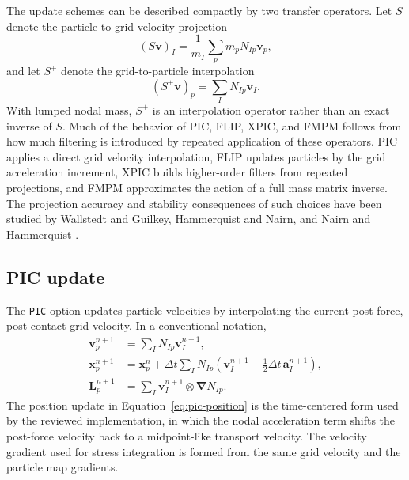 The update schemes can be described compactly by two transfer operators.  Let $S$ denote the particle-to-grid velocity projection
\begin{equation}
  (S\boldsymbol{v})_I = \frac{1}{m_I}\sum_p m_p N_{Ip}\boldsymbol{v}_p,
  \label{eq:operator-S}
\end{equation}
and let $S^+$ denote the grid-to-particle interpolation
\begin{equation}
  (S^+\boldsymbol{v})_p = \sum_I N_{Ip}\boldsymbol{v}_I.
  \label{eq:operator-S-plus}
\end{equation}
With lumped nodal mass, $S^+$ is an interpolation operator rather than an exact inverse of $S$.  Much of the behavior of PIC, FLIP, XPIC, and FMPM follows from how much filtering is introduced by repeated application of these operators.  PIC applies a direct grid velocity interpolation, FLIP updates particles by the grid acceleration increment, XPIC builds higher-order filters from repeated projections, and FMPM approximates the action of a full mass matrix inverse.  The projection accuracy and stability consequences of such choices have been studied by Wallstedt and Guilkey, Hammerquist and Nairn, and Nairn and Hammerquist \cite{wallstedt2007projection,wallstedt2008explicit,hammerquist2017xpic,nairn2021fmpm}.

\subsection{PIC update}
\label{subsec:pic-update}

The \texttt{PIC} option updates particle velocities by interpolating the current post-force, post-contact grid velocity.  In a conventional notation,
\begin{align}
  \boldsymbol{v}^{n+1}_p
    &= \sum_I N_{Ip}\boldsymbol{v}^{n+1}_I,
  \label{eq:pic-velocity}\\
  \boldsymbol{x}^{n+1}_p
    &= \boldsymbol{x}^{n}_p
     +\Delta t\sum_I N_{Ip}\left(\boldsymbol{v}^{n+1}_I
       -\frac{1}{2}\Delta t\,\boldsymbol{a}^{n+1}_I\right),
  \label{eq:pic-position}\\
  \boldsymbol{L}^{n+1}_p
    &= \sum_I \boldsymbol{v}^{n+1}_I\otimes\boldsymbol{\nabla}N_{Ip}.
  \label{eq:pic-velocity-gradient}
\end{align}
The position update in Equation~\eqref{eq:pic-position} is the time-centered form used by the reviewed implementation, in which the nodal acceleration term shifts the post-force velocity back to a midpoint-like transport velocity.  The velocity gradient used for stress integration is formed from the same grid velocity and the particle map gradients.

